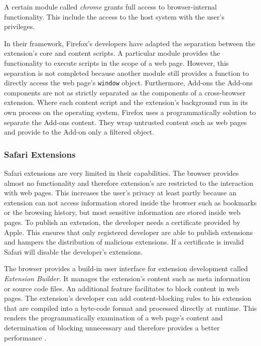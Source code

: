 	A certain module called \textit{chrome} grants full access to browser-internal functionality. This include the access to the host system with the user's privileges.  
	
	In their framework, Firefox's developers have adapted the separation between the extension's core and content scripts. A particular module provides the functionality to execute scripts in the scope of a web page. However, this separation is not completed because another module still provides a function to directly access the web page's \texttt{window} object. Furthermore, Add-ons 	
	the Add-ons components are not as strictly separated as the components of a cross-browser extension. Where each content script and the extension's background run in its own process on the operating system, Firefox uses a programmatically solution to separate the Add-ons content. They wrap untrusted content such as web pages and provide to the Add-on only a filtered object. 

\subsubsection{Safari Extensions}

	Safari extensions are very limited in their capabilities. The browser provides almost no functionality and therefore extension's are restricted to the interaction with web pages. This increases the user's privacy at least partly because an extension can not access information stored inside the browser such as bookmarks or the browsing history, but most sensitive information are stored inside web pages. To publish an extension, the developer needs a certificate provided by Apple. This ensures that only registered developer are able to publish extensions and hampers the distribution of malicious extensions. If a certificate is invalid Safari will disable the developer's extensions.
	
	The browser provides a build-in user interface for extension development called \textit{Extension Builder}. It manages the extension's content such as meta information or source code files.	An additional feature facilitates to block content in web pages. The extension's developer can add content-blocking rules to his extension that are compiled into a byte-code format and processed directly at runtime. This renders the programmatically examination of a web page's content and determination of blocking unnecessary and therefore provides a better performance \cite{safariContentBlockingRules}.  